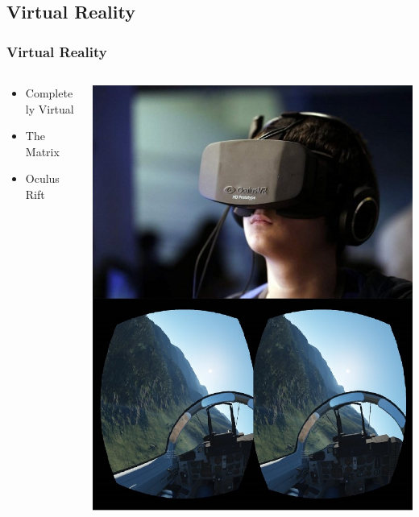 \documentclass{beamer}
\begin{document}
\subsection{Virtual Reality}
\begin{frame}
	\frametitle{Virtual Reality}
	\begin{columns}
    \begin{column}{0.4\textwidth}
	\begin{itemize}
		\item Completely Virtual
		\item The Matrix 
		\item Oculus Rift
	\end{itemize}
	\end{column}
	\begin{column}{0.4\textwidth}
	\includegraphics[width=\textwidth]{images/OculusRift}
	\end{column}
    \end{columns}
\end{frame}
\end{document}
